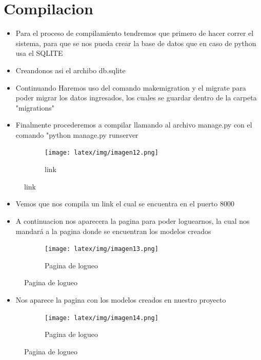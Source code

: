 \documentclass{article}
\begin{document}
	\section{Compilacion  }
	\begin{itemize}
		\item Para el proceso de compilamiento tendremos que primero de hacer correr el sistema, para que se nos pueda crear la base de datos que en caso de python usa el SQLITE
		\item Creandonos asi el archibo db.sqlite
		\item Continuando Haremos uso del comando makemigration y el migrate para poder migrar los datos ingresados, los cuales se guardar dentro de la carpeta "migrations"
            \item Finalmente procederemos a compilar llamando al archivo manage.py con el comando "python manage.py runserver
		\Continuaremos 
	\end{itemize}
         \begin{figure}[h]
                \begin{subfigure}{0.5\textwidth}
                    \centering
                    \texttt{[image: latex/img/imagen12.png]}
                    \caption{link }
                    \label{fig:primer}
                \end{subfigure}
            \end{figure}
            \begin{itemize}
		\item Vemos que nos compila un link el cual se encuentra en el puerto 8000
		\Continuaremos 
	\end{itemize}
        \newpage
        \begin{itemize}
		\item A continuacion nos aparecera la pagina para poder loguearnos, la cual nos mandará a la pagina donde se encuentran los modelos creados
		\Continuaremos 
	\end{itemize}
         \begin{figure}[h]
                \begin{subfigure}{0.5\textwidth}
                    \centering
                    \texttt{[image: latex/img/imagen13.png]}
                    \caption{Pagina de logueo }
                    \label{fig:primer}
                \end{subfigure}
            \end{figure}
            \begin{itemize}
		\item Nos aparece la pagina con los modelos creados en nuestro proyecto
		\Continuaremos 
	\end{itemize}
         \begin{figure}[h]
                \begin{subfigure}{0.5\textwidth}
                    \centering
                    \texttt{[image: latex/img/imagen14.png]}
                    \caption{Pagina de logueo }
                    \label{fig:primer}
                \end{subfigure}
            \end{figure}
	
\end{document}
